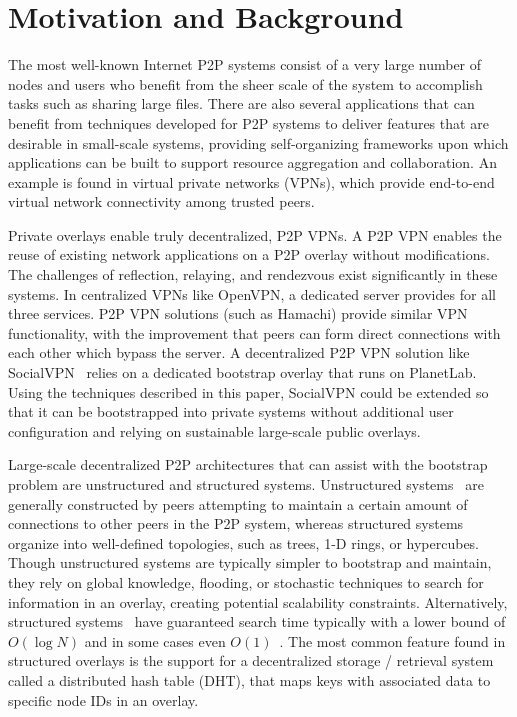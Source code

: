 \documentclass[conference]{IEEEtran}
\begin{document}
\section{Motivation and Background}
\label{background}

The most well-known Internet P2P systems consist of a very large number of
nodes and users who benefit from the sheer scale of the system to accomplish
tasks such as sharing large files. There are also several applications that can
benefit from techniques developed for P2P systems to deliver features that are
desirable in small-scale systems, providing self-organizing frameworks upon
which applications can be built to support resource aggregation and
collaboration.  An example is found in virtual private networks (VPNs), which
provide end-to-end virtual network connectivity among trusted peers.

Private overlays enable truly decentralized, P2P VPNs.  A P2P VPN enables the
reuse of existing network applications on a P2P overlay without modifications.
The challenges of reflection, relaying, and rendezvous exist significantly in
these systems.  In centralized VPNs like OpenVPN, a dedicated server provides
for all three services.  P2P VPN solutions (such as Hamachi) provide similar
VPN functionality, with the improvement that peers can form direct connections
with each other which bypass the server.  A decentralized P2P VPN solution like
SocialVPN~\cite{socialvpn} relies on a dedicated bootstrap overlay that runs on
PlanetLab.  Using the techniques described in this paper, SocialVPN could be
extended so that it can be bootstrapped into private systems without additional
user configuration and relying on sustainable large-scale public overlays.

Large-scale decentralized P2P architectures that can assist with the bootstrap
problem are unstructured and structured systems.  Unstructured
systems~\cite{gnutella, fasttrack} are generally constructed by peers
attempting to maintain a certain amount of connections to other peers in the
P2P system, whereas structured systems organize into well-defined topologies,
such as trees, 1-D rings, or hypercubes.  Though unstructured systems are
typically simpler to bootstrap and maintain, they rely on global knowledge,
flooding, or stochastic techniques to search for information in an overlay,
creating potential scalability constraints.  Alternatively, structured
systems~\cite{pastry, chord, symphony, kademlia, can} have guaranteed search
time typically with a lower bound of $O(\log N)$ and in some cases even
$O(1)$~\cite{beehive}.  The most common feature found in structured overlays is
the support for a decentralized storage / retrieval system called a distributed
hash table (DHT), that maps keys with associated data to specific node IDs in
an overlay.  
\end{document}
